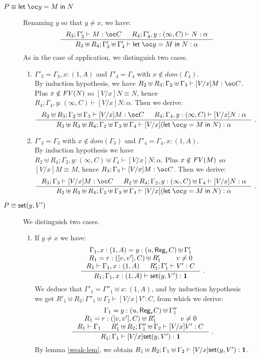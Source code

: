 \documentclass[11pt]{article}
\newcommand{\st}[2]{{\sf set}(#1,#2)}
\newcommand{\regtype}[2]{{\sf Reg}_{#1} #2}
\newcommand{\upair}[2]{[#1,#2]}
\newcommand{\letb}[3]{\mathsf{let}\;\oc #1 = #2\;\mathsf{in}\;#3}
\begin{document}
\begin{description}
  \item[$P \equiv \letb{y}{M}{N}$] Renaming $y$ so that $y\neq x$, we have:
    $$
    \inference
    {R_3;\Gamma'_3\vdash M:\oc C & R_4;\Gamma'_4,y:(\infty,C)\vdash N:\alpha}
    {R_3\uplus R_4;\Gamma'_3\uplus\Gamma'_4\vdash \letb{y}{M}{N}:\alpha}
    $$
    As in the case of application, we distinguish two cases.

    \begin{enumerate}

    \item $\Gamma'_3=\Gamma_3,x:(1,A)$ and $\Gamma'_4=\Gamma_4$ with $x \notin dom(\Gamma_4)$.\\
      By induction hypothesis, we have $R_2\uplus R_3;\Gamma_2\uplus\Gamma_3\vdash [V/x]M:\oc C$. Plus $x \notin {\it FV}(N)$ so $[V/x]N\equiv N$, hence $R_4;\Gamma_4,y:(\infty,C)\vdash [V/x]N:\alpha$. Then we derive:
      $$
      \inference
      {R_2\uplus R_3;\Gamma_2\uplus\Gamma_3\vdash [V/x]M:\oc C & R_4;\Gamma_4,y:(\infty,C)\vdash [V/x]N:\alpha}
      {R_2\uplus R_3\uplus R_4;\Gamma_2\uplus\Gamma_3\uplus\Gamma_4\vdash [V/x](\letb{y}{M}{N}):\alpha}~.
      $$

    \item $\Gamma'_3=\Gamma_3$ with $x \notin dom(\Gamma_3)$ and $\Gamma'_4=\Gamma_4,x:(1,A)$.\\
      By induction hypothesis we have $R_2\uplus
      R_4;\Gamma_2,y:(\infty,C)\uplus\Gamma_4\vdash
      [V/x]N:\alpha$. Plus $x \notin {\it FV}(M)$ so $[V/x]M \equiv M$, hence $R_3;\Gamma_3\vdash [V/x]M: \oc C$. Then we derive:
      $$
      \inference
      {R_3;\Gamma_3\vdash [V/x]M: \oc C & R_2\uplus R_4;\Gamma_2,y:(\infty,C)\uplus\Gamma_4\vdash [V/x]N:\alpha}
      {R_2\uplus R_3\uplus R_4;\Gamma_2\uplus\Gamma_3\uplus\Gamma_4\vdash [V/x](\letb{y}{M}{N}):\alpha}~.
      $$
    \end{enumerate}


  \item[$P \equiv \st{y}{V'}$] We distinguish two cases. \\

\begin{enumerate}

\item  If $y \neq x$ we have:
    $$
    \inference
    {\Gamma_1,x:(1,A)=y:(u,\regtype{r}C)\uplus\Gamma'_1\\
      R_1=r:(\upair{v}{v'},C)\uplus R'_1 & v \neq 0\\
      R_1\vdash\Gamma_1,x:(1,A) & R'_1;\Gamma'_1\vdash V':C}
    {R_1;\Gamma_1,x:(1,A) \vdash \st{y}{V'}:\tertype}~.
    $$
    We deduce that $\Gamma'_1=\Gamma''_1\uplus x:(1,A)$, and by
    induction hypothesis we get $R'_1\uplus
    R_2;\Gamma''_1\uplus\Gamma_2\vdash [V/x]V' :C$, from which we
    derive:
    $$
    \inference
    {\Gamma_1=y:(u,\regtype{r}C)\uplus\Gamma''_1\\
      R_1=r:(\upair{v}{v'},C)\uplus R'_1 & v \neq 0\\
      R_1\vdash\Gamma_1 & R'_1\uplus R_2;\Gamma''_1\uplus\Gamma_2\vdash [V/x]V':C}
    {R_1;\Gamma_1 \vdash [V/x]\st{y}{V'}:\tertype}~.
    $$
    By lemma \ref{weak-lem}, 
we obtain $R_1\uplus R_2;\Gamma_1\uplus\Gamma_2 \vdash [V/x]\st{y}{V'}:\tertype$.
    

\end{enumerate}
\end{description}
\end{document}
